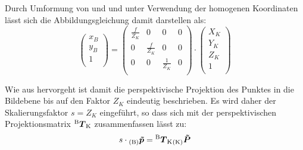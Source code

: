 Durch Umformung von  und  und unter Verwendung der homogenen Koordinaten lässt sich die Abbildungsgleichung damit darstellen als:
\begin{equation}
\left(\begin{array}{c}
x_B\\
y_B\\
1\\
\end{array}\right) = \left(\begin{array}{cccc}
\frac{f}{Z_K} & 0 & 0 & 0\\
0 & \frac{f}{Z_K} & 0 & 0\\
0 & 0 & \frac{1}{Z_K} & 0\\
\end{array}\right)\cdot\left(\begin{array}{c}
X_K\\
Y_K\\
Z_K\\
1\\
\end{array}\right)  
\label{eq.perspProj}
\end{equation}

Wie aus  hervorgeht ist damit die perspektivische Projektion des Punktes in die Bildebene bis auf den Faktor $Z_K$ eindeutig beschrieben. Es wird daher der Skalierungsfaktor $s=Z_K$ eingeführt, so dass sich  mit der perspektivischen Projektionsmatrix ${^{\mathrm{B}}\mbox{\boldmath{$T$}}_{\mathrm{K}}}$ zusammenfassen lässt zu:
\begin{equation}
s\cdot{_{{\mathrm{(B)}}}}\mbox{\boldmath{$\tilde{p}$}} = {^{\mathrm{B}}\mbox{\boldmath{$T$}}_{\mathrm{K}}}{_{{\mathrm{(K)}}}}\mbox{\boldmath{$\tilde{P}$}}
\end{equation}

